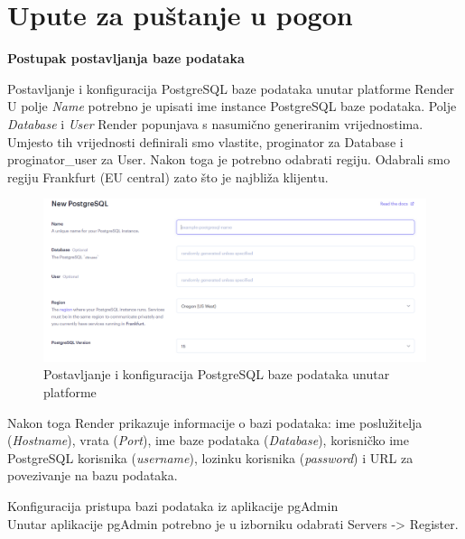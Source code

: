 			\eject 
		
		\section{Upute za puštanje u pogon}
	

\textbf{Postupak postavljanja baze podataka}

    \begin{packed_item}
		\item Postavljanje i konfiguracija PostgreSQL baze podataka unutar platforme Render \\
		
		U polje \textit{Name} potrebno je upisati ime instance PostgreSQL baze podataka. Polje \textit{Database} i \textit{User} Render popunjava s nasumično generiranim vrijednostima. Umjesto tih vrijednosti definirali smo vlastite, proginator za Database i proginator\_user za User. Nakon toga je potrebno odabrati regiju. Odabrali smo regiju Frankfurt (EU central) zato što je najbliža klijentu. 
		
		\begin{figure}[H]
			\includegraphics[width=\textwidth]{slike/Baza_podataka1.PNG} %
			\caption{Postavljanje i konfiguracija PostgreSQL baze podataka unutar platforme}
			\label{fig:bazapodataka1} %
		\end{figure}
		
		Nakon toga Render prikazuje informacije o bazi podataka: ime poslužitelja (\textit{Hostname}), vrata (\textit{Port}), ime baze podataka (\textit{Database}), korisničko ime PostgreSQL korisnika (\textit{username}), lozinku korisnika (\textit{password}) i URL za povezivanje na bazu podataka. 
		
		\item Konfiguracija pristupa bazi podataka iz aplikacije pgAdmin \\
		Unutar aplikacije pgAdmin potrebno je u izborniku odabrati Servers -> Register.
		

\end{packed_item}
